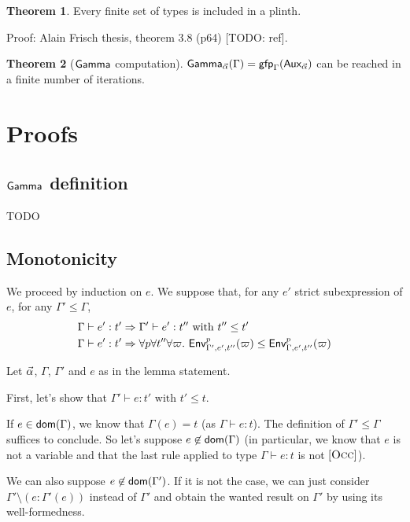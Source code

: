 \documentclass[a4paper]{article}
\theoremstyle{definition}
\newtheorem{theorem}{Theorem}
\begin{document}
        \begin{theorem}
          Every finite set of types is included in a plinth.
        \end{theorem}
        Proof: Alain Frisch thesis, theorem 3.8 (p64) [TODO: ref].

        \begin{theorem}[$\textsf{Gamma}_{}$ computation]
          $\textsf{Gamma}_{\vec \alpha}(\Gamma)=\textsf{gfp}_\Gamma (\textsf{Aux}_{\vec \alpha})$ can be reached in a finite number of iterations.
        \end{theorem}

    \section{Proofs}

    \subsection{$\textsf{Gamma}_{}$ definition}

    TODO

    \subsection{Monotonicity}
    
      We proceed by induction on $e$. We suppose that, for any $e'$ strict subexpression of $e$, for any $\Gamma' \leq \Gamma$,
      \begin{align*}
        &\Gamma \vdash e':t' \Rightarrow \Gamma' \vdash e':t'' \text{ with } t'' \leq t'\\
        &\Gamma \vdash e':t' \Rightarrow \forall p \forall t'' \forall \varpi.\ \textsf{Env}^{p}_{\Gamma',e',t''} (\varpi) \leq \textsf{Env}^{p}_{\Gamma,e',t''} (\varpi)
      \end{align*}
  
      Let $\vec \alpha$, $\Gamma$, $\Gamma'$ and $e$ as in the lemma statement.

      First, let's show that $\Gamma' \vdash e:t' \text{ with } t' \leq t$.
  
      If $e\in\textsf{dom}(\Gamma)$, we know that $\Gamma(e)=t$ (as $\Gamma \vdash e:t$). The definition of $\Gamma' \leq \Gamma$ suffices to conclude.
      So let's suppose $e\not\in\textsf{dom}(\Gamma)$ (in particular, we know that $e$ is not a variable and that the last rule applied to type $\Gamma \vdash e:t$ is not $[\textsc{Occ}]$).
  
      We can also suppose $e\not\in\textsf{dom}(\Gamma')$. If it is not the case, we can just consider $\Gamma'\setminus(e:\Gamma'(e))$ instead of $\Gamma'$
      and obtain the wanted result on $\Gamma'$ by using its well-formedness.
\end{document}
